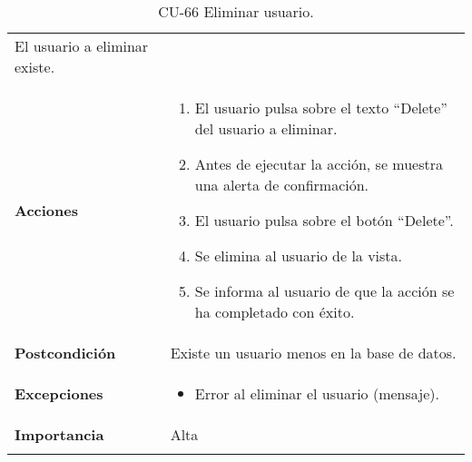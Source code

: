 \begin{longtable}[]{@{}ll@{}}
\begin{minipage}[t]{0.68\columnwidth}
El usuario a eliminar existe.\strut
\end{minipage}\tabularnewline
\begin{minipage}[t]{0.26\columnwidth}\raggedright
\textbf{Acciones}\strut
\end{minipage} & \begin{minipage}[t]{0.68\columnwidth}\raggedright
\begin{enumerate}
\def\labelenumi{\arabic{enumi}.}
\tightlist
\item
  El usuario pulsa sobre el texto ``Delete'' del usuario a eliminar.
\item
  Antes de ejecutar la acción, se muestra una alerta de confirmación.
\item
  El usuario pulsa sobre el botón ``Delete''.
\item
  Se elimina al usuario de la vista.
\item
  Se informa al usuario de que la acción se ha completado con éxito.
\end{enumerate}\strut
\end{minipage}\tabularnewline
\begin{minipage}[t]{0.26\columnwidth}\raggedright
\textbf{Postcondición}\strut
\end{minipage} & \begin{minipage}[t]{0.68\columnwidth}\raggedright
Existe un usuario menos en la base de datos.\strut
\end{minipage}\tabularnewline
\begin{minipage}[t]{0.26\columnwidth}\raggedright
\textbf{Excepciones}\strut
\end{minipage} & \begin{minipage}[t]{0.68\columnwidth}\raggedright
\begin{itemize}
\tightlist
\item
  Error al eliminar el usuario (mensaje).
\end{itemize}\strut
\end{minipage}\tabularnewline
\begin{minipage}[t]{0.26\columnwidth}\raggedright
\textbf{Importancia}\strut
\end{minipage} & \begin{minipage}[t]{0.68\columnwidth}\raggedright
Alta\strut
\end{minipage}\tabularnewline
\bottomrule
\caption{CU-66 Eliminar usuario.}
\end{longtable}

